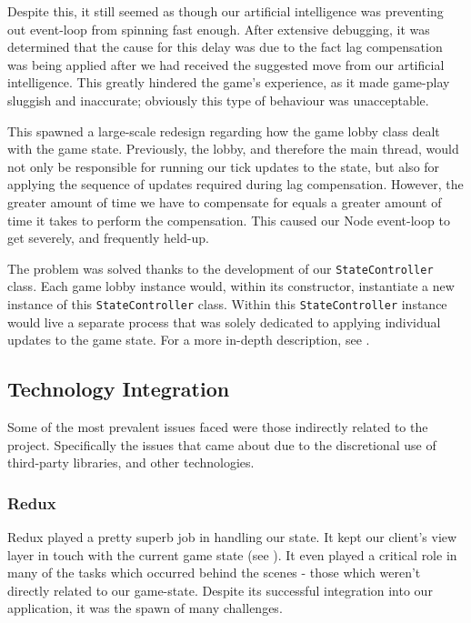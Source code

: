 \documentclass{standalone}
\begin{document}
			Despite this, it still seemed as though our artificial intelligence was preventing out event-loop from spinning fast enough. After extensive debugging, it was determined that the cause for this delay was due to the fact lag compensation was being applied after we had received the suggested move from our artificial intelligence. This greatly hindered the game's experience, as it made game-play sluggish and inaccurate; obviously this type of behaviour was unacceptable.

			This spawned a large-scale redesign regarding how the game lobby class dealt with the game state. Previously, the lobby, and therefore the main thread, would not only be responsible for running our tick updates to the state, but also for applying the sequence of updates required during lag compensation. However, the greater amount of time we have to compensate for equals a greater amount of time it takes to perform the compensation. This caused our Node event-loop to get severely, and frequently held-up.

			The problem was solved thanks to the development of our \texttt{StateController} class. Each game lobby instance would, within its constructor, instantiate a new instance of this \texttt{StateController} class. Within this \texttt{StateController} instance would live a separate process that was solely dedicated to applying individual updates to the game state. For a more in-depth description, see .

		\subsection{Technology Integration}
			Some of the most prevalent issues faced were those indirectly related to the project. Specifically the issues that came about due to the discretional use of third-party libraries, and other technologies.

			\subsubsection{Redux}
				Redux played a pretty superb job in handling our state. It kept our client's view layer in touch with the current game state (see ). It even played a critical role in many of the tasks which occurred behind the scenes - those which weren't directly related to our game-state. Despite its successful integration into our application, it was the spawn of many challenges.
\end{document}
